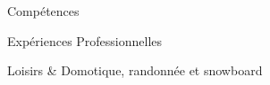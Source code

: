 

\begin{rubriquetableau}[\firstcolumnwidth]{Compétences}
	
	
\end{rubriquetableau}

\begin{rubriquetableau}[\firstcolumnwidth]{Expériences Professionnelles}
    
    
    
	
\end{rubriquetableau}
    


\begin{rubriquetableau}[\firstcolumnwidth]{Loisirs}
	& Domotique, randonnée et snowboard
\end{rubriquetableau}
